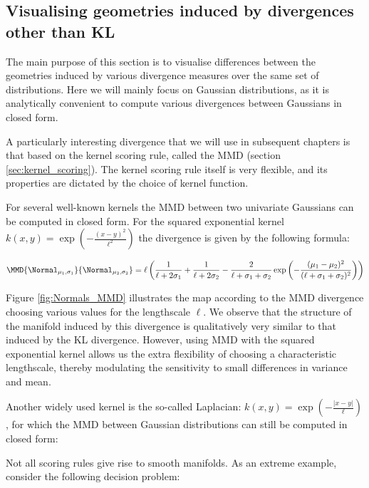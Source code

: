 \subsection{Visualising geometries induced by divergences other than KL}

The main purpose of this section is to visualise differences between the geometries induced by various divergence measures over the same set of distributions. Here we will mainly focus on Gaussian distributions, as it is analytically convenient to compute various divergences between Gaussians in closed form.

A particularly interesting divergence that we will use in subsequent chapters is that based on the kernel scoring rule, called the MMD (section \ref{sec:kernel_scoring}). The kernel scoring rule itself is very flexible, and its properties are dictated by the choice of kernel function.

For several well-known kernels the MMD between two univariate Gaussians can be computed in closed form. For the squared exponential kernel $k(x,y)=\exp(-\frac{(x-y)^2}{\ell^2})$ the divergence is given by the following formula:

\begin{equation}
	\MMD{\Normal_{\mu_1,\sigma_1}}{\Normal_{\mu_2,\sigma_2}} = \ell\left(\frac{1}{\ell+2\sigma_1} + \frac{1}{\ell+2\sigma_2} - \frac{2}{\ell+\sigma_1 + \sigma_2}\exp\left(-\frac{(\mu_1 - \mu_2)^2}{(\ell + \sigma_1 + \sigma_2)^2}\right)\right)
\end{equation}

Figure \ref{fig:Normals_MMD} illustrates the map according to the MMD divergence choosing various values for the lengthscale $\ell$.   We observe that the structure of the manifold induced by this divergence is qualitatively very similar to that induced by the KL divergence. However, using MMD with the squared exponential kernel allows us the extra flexibility of choosing a characteristic lengthscale, thereby modulating the sensitivity to small differences in variance and mean.

Another widely used kernel is the so-called Laplacian: $k(x,y)=\exp\left(-\frac{\vert x-y\vert}{\ell}\right)$, for which the MMD between Gaussian distributions can still be computed in closed form:


Not all scoring rules give rise to smooth manifolds. As an extreme example, consider the following decision problem:

